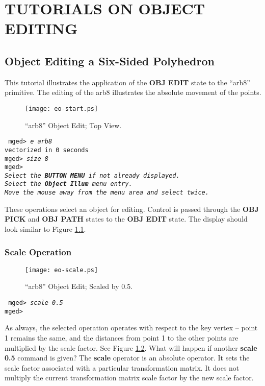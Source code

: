 \chapter{TUTORIALS ON OBJECT EDITING}

\section{Object Editing a Six-Sided Polyhedron}

This tutorial illustrates the application of the {\bf OBJ EDIT} state to
the ``arb8'' primitive.  The editing of the arb8 illustrates the
absolute movement of the points.

\begin{figure}
\centering \texttt{[image: eo-start.ps]}
\caption{``arb8'' Object Edit; Top View.}
\label{eo-start}
\end{figure}

\noindent
{\tt
mged> {\em e arb8}\\
vectorized in 0 seconds\\
mged> {\em size 8}\\
mged>\\
{\em Select the {\bf BUTTON MENU} if not already displayed.} \\
{\em Select the {\bf Object Illum} menu entry.} \\
{\em Move the mouse away from the menu area and select twice.} \\
}

These operations select an object for editing.
Control is passed through the {\bf OBJ PICK} and {\bf OBJ PATH} states
to the {\bf OBJ EDIT} state.  The display should look similar to
Figure \ref{eo-start}.

\subsection{Scale Operation}

\begin{figure}
\centering \texttt{[image: eo-scale.ps]}
\caption{``arb8'' Object Edit; Scaled by 0.5.}
\label{eo-scale}
\end{figure}

\noindent
{\tt
mged> {\em scale 0.5}\\
mged>\\
}

As always, the selected operation operates with respect to the key
vertex -- point 1 remains the same, and the distances from point 1 to
the other points are multiplied by the scale factor.  See Figure
\ref{eo-scale}.  What will happen if another {\bf scale 0.5} command
is given?  The {\bf scale} operator is an absolute operator.  It sets
the scale factor associated with a particular transformation matrix.
It does not multiply the current transformation matrix scale factor by
the new scale factor.

